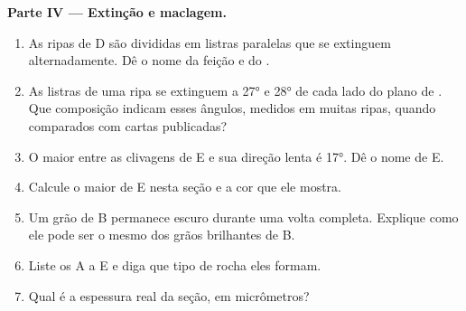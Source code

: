 \begin{problem}
\medskip
\noindent\textbf{Parte IV --- Extinção e maclagem.}
\begin{enumerate}[resume]
  \item As ripas de D são divididas em listras paralelas que se extinguem alternadamente. Dê o nome da feição e do .
  \item As listras de uma ripa se extinguem a \ang{27} e \ang{28} de cada lado do plano de . Que composição indicam esses ângulos, medidos em muitas ripas, quando comparados com cartas publicadas?
  \item O maior  entre as clivagens de E e sua direção lenta é \ang{17}. Dê o nome de E.
  \item Calcule o maior  de E nesta seção e a cor que ele mostra.
  \item Um grão de B permanece escuro durante uma volta completa. Explique como ele pode ser o mesmo  dos grãos brilhantes de B.
  \item Liste os  A a E e diga que tipo de rocha eles formam.
  \item Qual é a espessura real da seção, em micrômetros?
\end{enumerate}
\end{problem}
